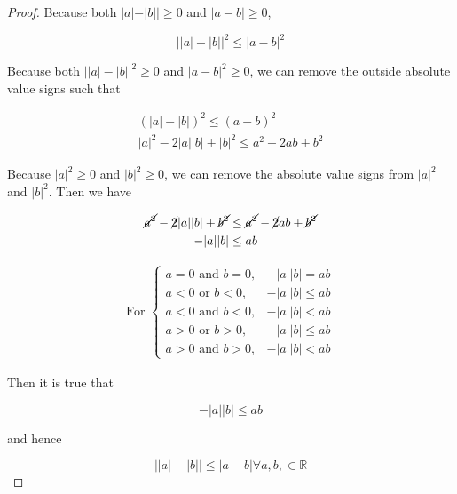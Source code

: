 \documentclass{article}
\begin{document}
    \begin{proof}
        Because both $\big |a|-|b|\big|\geq 0$ and $|a-b|\geq 0$,

        \[
            \big| |a|-|b|\big|^2 \leq |a-b|^2
        \]

        Because both $\big| |a|-|b|\big|^2\geq 0$ and $|a-b|^2\geq 0$, we can remove the outside absolute value signs such that

        \begin{align*}
            \left(|a|-|b|\right)^2 \leq (a-b)^2 \\
            |a|^2 - 2|a||b| + |b|^2 \leq a^2 - 2ab + b^2
        \end{align*}

        Because $|a|^2\geq 0$ and $|b|^2\geq 0$, we can remove the absolute value signs from $|a|^2$ and $|b|^2$. Then we have

        \begin{align*}
            \cancel{a^2} - \cancel{2}|a||b| + \cancel{b^2}   & \leq \cancel{a^2} -\cancel{2}ab + \cancel{b^2} \\
            -|a||b|                                          & \leq ab
        \end{align*}

        \begin{align*}
            \text{For }
            \begin{cases}
                a=0 \text{ and } b=0,       & -|a||b| = ab \\
                a<0 \text{ or }  b<0,       & -|a||b| \leq ab \\
                a<0 \text{ and } b<0,       & -|a||b| < ab \\
                a>0 \text{ or }  b>0,       & -|a||b| \leq ab \\
                a>0 \text{ and } b>0,       & -|a||b| < ab
            \end{cases}
        \end{align*}

        Then it is true that

        \[
            -|a||b| \leq ab
        \]

        and hence

        \[
            \big| |a| - |b|\big|\leq |a-b| \forall a,b,\in\mathbb{R}
        \]


    \end{proof}



    \pagebreak
    \thispagestyle{page4}
\end{document}
